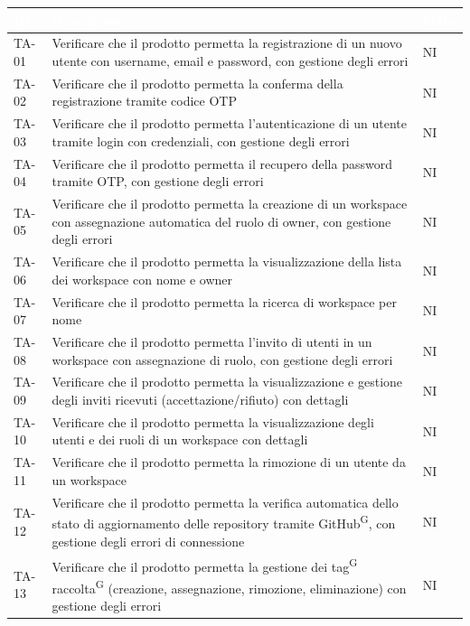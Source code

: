 \documentclass[a4paper, 11pt]{article}
\renewcommand{\arraystretch}{1.4} %
\begin{document}
\renewcommand{\arraystretch}{1.5}
\setlength{\LTleft}{0pt plus 1fill}\setlength{\LTright}{0pt plus 1fill}\begin{longtable}{>{\centering\arraybackslash}m{1.5cm} >{\raggedright\arraybackslash}p{11cm} >{\centering\arraybackslash}m{1.2cm}}
\rowcolor{AccentColor}
\textcolor{white}{\textbf{ID}} & \textcolor{white}{\textbf{Descrizione}} & \textcolor{white}{\textbf{Stato}} \\
\endhead

TA-01 & Verificare che il prodotto permetta la registrazione di un nuovo utente con username, email e password, con gestione degli errori & NI \\
TA-02 & Verificare che il prodotto permetta la conferma della registrazione tramite codice OTP & NI \\
TA-03 & Verificare che il prodotto permetta l'autenticazione di un utente tramite login con credenziali, con gestione degli errori & NI \\
TA-04 & Verificare che il prodotto permetta il recupero della password tramite OTP, con gestione degli errori & NI \\
TA-05 & Verificare che il prodotto permetta la creazione di un workspace con assegnazione automatica del ruolo di owner, con gestione degli errori & NI \\
TA-06 & Verificare che il prodotto permetta la visualizzazione della lista dei workspace con nome e owner & NI \\
TA-07 & Verificare che il prodotto permetta la ricerca di workspace per nome & NI \\
TA-08 & Verificare che il prodotto permetta l'invito di utenti in un workspace con assegnazione di ruolo, con gestione degli errori & NI \\
TA-09 & Verificare che il prodotto permetta la visualizzazione e gestione degli inviti ricevuti (accettazione/rifiuto) con dettagli & NI \\
TA-10 & Verificare che il prodotto permetta la visualizzazione degli utenti e dei ruoli di un workspace con dettagli & NI \\
TA-11 & Verificare che il prodotto permetta la rimozione di un utente da un workspace & NI \\
TA-12 & Verificare che il prodotto permetta la verifica automatica dello stato di aggiornamento delle repository tramite GitHub\textsuperscript{G}, con gestione degli errori di connessione & NI \\
TA-13 & Verificare che il prodotto permetta la gestione dei tag\textsuperscript{G} raccolta\textsuperscript{G} (creazione, assegnazione, rimozione, eliminazione) con gestione degli errori & NI \\

\end{longtable}
\end{document}
